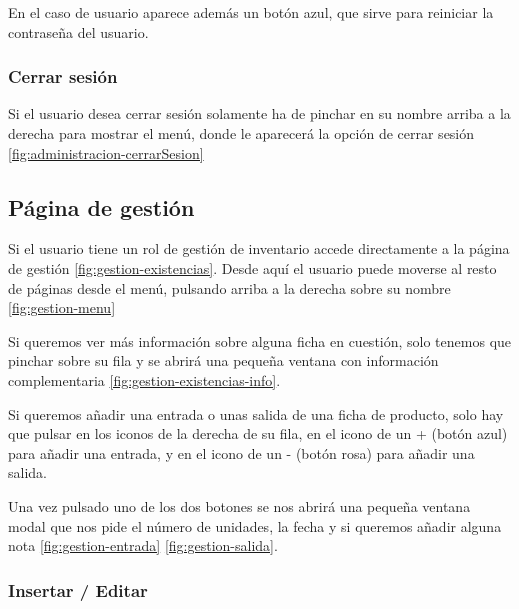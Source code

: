 En el caso de usuario aparece además un botón azul, que sirve para reiniciar la contraseña del usuario.


\subsubsection{Cerrar sesión}

Si el usuario desea cerrar sesión solamente ha de pinchar en su nombre arriba a la derecha para mostrar el menú, donde le aparecerá la opción de cerrar sesión \ref{fig:administracion-cerrarSesion} 


\subsection{Página de gestión}

Si el usuario tiene un rol de gestión de inventario accede directamente a la página de gestión \ref{fig:gestion-existencias}. Desde aquí el usuario puede moverse al resto de páginas desde el menú, pulsando arriba a la derecha sobre su nombre \ref{fig:gestion-menu}


Si queremos ver más información sobre alguna ficha en cuestión, solo tenemos que pinchar sobre su fila y se abrirá una pequeña ventana con información complementaria \ref{fig:gestion-existencias-info}.


Si queremos añadir una entrada o unas salida de una ficha de producto, solo hay que pulsar en los iconos de la derecha de su fila, en el icono de un + (botón azul) para añadir una entrada, y en el icono de un - (botón rosa) para añadir una salida.

Una vez pulsado uno de los dos botones se nos abrirá una pequeña ventana modal que nos pide el número de unidades, la fecha y si queremos añadir alguna nota \ref{fig:gestion-entrada} \ref{fig:gestion-salida}.  



\subsubsection{Insertar / Editar}

